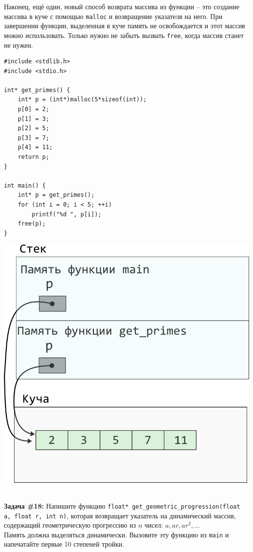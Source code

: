 \documentclass{article}
\begin{document}
Наконец, ещё один, новый способ возврата массива из функции -- это создание
массива в куче с помощью \texttt{malloc} и возвращение указателя на него.
При завершении функции, выделенная в куче память не освобождается и этот массив
можно использовать. Только нужно не забыть вызвать \texttt{free}, когда 
массив станет не нужен.
\begin{multicols}{2}
\begin{lstlisting}
#include <stdlib.h>
#include <stdio.h>

int* get_primes() {
	int* p = (int*)malloc(5*sizeof(int));
	p[0] = 2;
	p[1] = 3;
	p[2] = 5;
	p[3] = 7;
	p[4] = 11;
	return p;
}

int main() {
	int* p = get_primes();
	for (int i = 0; i < 5; ++i)
		printf("%d ", p[i]);
	free(p);
}
\end{lstlisting}
\columnbreak
\begin{center}
\includegraphics[scale=1]{../images/pointer_schemes/function_return_heap_array.png}
\end{center}
\end{multicols}
\quad\\
\textbf{Задача \#18:} Напишите функцию \texttt{float* get\_geometric\_progression(float a, float r, int n)}, которая возвращает указатель на динамический массив, содержащий геометрическую прогрессию из $n$ чисел: 
$a, ar, ar^2, ...$\\
Память должна выделяться динамически. Вызовите эту функцию из \texttt{main} и напечатайте первые 10 степеней тройки.
\end{document}
